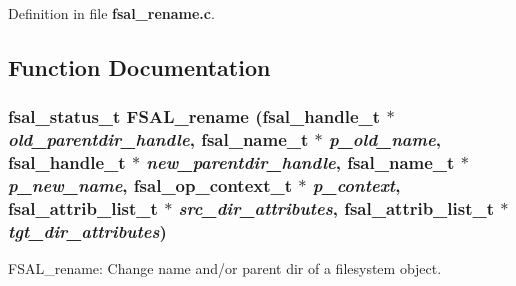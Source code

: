 Definition in file {\bf fsal\_\-rename.c}.

\subsection{Function Documentation}
\subsubsection{\setlength{\rightskip}{0pt plus 5cm}fsal\_\-status\_\-t FSAL\_\-rename (fsal\_\-handle\_\-t $\ast$ {\em old\_\-parentdir\_\-handle}, fsal\_\-name\_\-t $\ast$ {\em p\_\-old\_\-name}, fsal\_\-handle\_\-t $\ast$ {\em new\_\-parentdir\_\-handle}, fsal\_\-name\_\-t $\ast$ {\em p\_\-new\_\-name}, fsal\_\-op\_\-context\_\-t $\ast$ {\em p\_\-context}, fsal\_\-attrib\_\-list\_\-t $\ast$ {\em src\_\-dir\_\-attributes}, fsal\_\-attrib\_\-list\_\-t $\ast$ {\em tgt\_\-dir\_\-attributes})}\label{fsal__rename_8c_a0}


FSAL\_\-rename: Change name and/or parent dir of a filesystem object.

